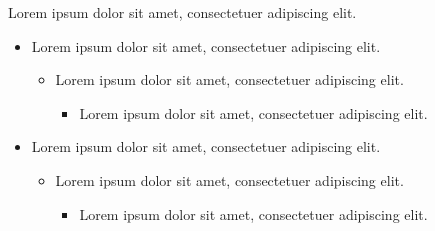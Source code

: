 \documentclass[12pt, aspectratio=169]{beamer}
\begin{document}
\begin{frame}[t]{\secname}{Lorem ipsum dolor sit amet, consectetuer adipiscing elit.}
    \begin{minipage}[t]{0.49\textwidth}
        \begin{itemize}
            \item Lorem ipsum dolor sit amet, consectetuer adipiscing elit.
            \begin{itemize}
                \item Lorem ipsum dolor sit amet, consectetuer adipiscing elit.
                \begin{itemize}
                    \item Lorem ipsum dolor sit amet, consectetuer adipiscing elit.
                \end{itemize}
            \end{itemize}
        \end{itemize}
    \end{minipage}
    \hfill
    \begin{minipage}[t]{0.49\textwidth}
        \begin{itemize}
            \item Lorem ipsum dolor sit amet, consectetuer adipiscing elit.
            \begin{itemize}
                \item Lorem ipsum dolor sit amet, consectetuer adipiscing elit.
                \begin{itemize}
                    \item Lorem ipsum dolor sit amet, consectetuer adipiscing elit.
                \end{itemize}
            \end{itemize}
        \end{itemize}
    \end{minipage}
\end{frame}
\end{document}

